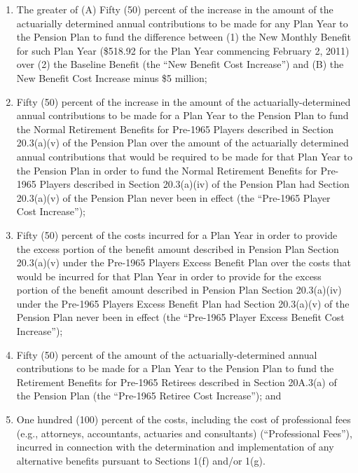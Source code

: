 \documentclass[
]{book}
\providecommand{\tightlist}{%
  \setlength{\itemsep}{0pt}\setlength{\parskip}{0pt}}
\begin{document}
\begin{enumerate}
  \begin{enumerate}
  \def\labelenumii{(\arabic{enumii})}
  \tightlist
  \item
    The greater of (A) Fifty (50) percent of the increase in the amount of the actuarially determined annual contributions to be made for any Plan Year to the Pension Plan to fund the difference between (1) the New Monthly Benefit for such Plan Year (\$518.92 for the Plan Year commencing February 2, 2011) over (2) the Baseline Benefit (the ``New Benefit Cost Increase'') and (B) the New Benefit Cost Increase minus \$5 million;
  \item
    Fifty (50) percent of the increase in the amount of the actuarially-determined annual contributions to be made for a Plan Year to the Pension Plan to fund the Normal Retirement Benefits for Pre-1965 Players described in Section 20.3(a)(v) of the Pension Plan over the amount of the actuarially determined annual contributions that would be required to be made for that Plan Year to the Pension Plan in order to fund the Normal Retirement Benefits for Pre-1965 Players described in Section 20.3(a)(iv) of the Pension Plan had Section 20.3(a)(v) of the Pension Plan never been in effect (the ``Pre-1965 Player Cost Increase'');
  \item
    Fifty (50) percent of the costs incurred for a Plan Year in order to provide the excess portion of the benefit amount described in Pension Plan Section 20.3(a)(v) under the Pre-1965 Players Excess Benefit Plan over the costs that would be incurred for that Plan Year in order to provide for the excess portion of the benefit amount described in Pension Plan Section 20.3(a)(iv) under the Pre-1965 Players Excess Benefit Plan had Section 20.3(a)(v) of the Pension Plan never been in effect (the ``Pre-1965 Player Excess Benefit Cost Increase'');
  \item
    Fifty (50) percent of the amount of the actuarially-determined annual contributions to be made for a Plan Year to the Pension Plan to fund the Retirement Benefits for Pre-1965 Retirees described in Section 20A.3(a) of the Pension Plan (the ``Pre-1965 Retiree Cost Increase''); and
  \item
    One hundred (100) percent of the costs, including the cost of professional fees (e.g., attorneys, accountants, actuaries and consultants) (``Professional Fees''), incurred in connection with the determination and implementation of any alternative benefits pursuant to Sections 1(f) and/or 1(g).
  \end{enumerate}


\end{enumerate}
\end{document}
